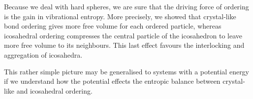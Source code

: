 Because we deal with hard spheres, we are sure that the driving force of ordering is the gain in vibrational entropy. More precisely, we showed that crystal-like bond ordering gives more free volume for each ordered particle, whereas icosahedral ordering compresses the central particle of the icosahedron to leave more free volume to its neighbours. This last effect favours the interlocking and aggregation of icosahedra.

This rather simple picture may be generalised to systems with a potential energy if we understand how the potential effects the entropic balance between crystal-like and icosahedral ordering.